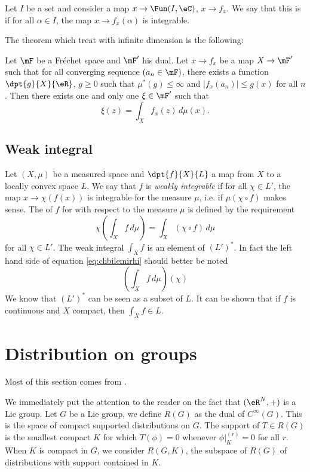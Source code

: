 Let $I$ be a set and consider a map $x\to\Fun(I,\eC)$, $x\to f_x$. We say that this is  if for all $\alpha\in I$, the map $x\to f_x(\alpha)$ is integrable.

The theorem which treat with infinite dimension is the following:

\begin{theorem}
   Let $\mF$ be a Fréchet space and $\mF'$ his dual. Let $x\to f_x$ be a map $X\to\mF'$ such that for all converging sequence $(a_n\in\mF)$, there exists a function  $\dpt{g}{X}{\eR}$, $g\geq0$ such that $\mu^*(g)\leq\infty$ and $| f_x(a_n) |\leq g(x)$ for all $n$. Then there exists one and only one $\xi\in\mF'$ such that
\begin{equation}
  \xi(z)=\int_Xf_x(z)\,d\mu(x).
\end{equation}

\end{theorem}

\subsection{Weak integral}

Let $(X,\mu)$ be a measured space and $\dpt{f}{X}{L}$ a map from $X$ to a locally convex space $L$. We say that $f$ is \emph{weakly integrable} if for all $\chi\in L'$, the map $x\to \chi(f(x))$ is integrable for the measure $\mu$, i.e. if $\mu(\chi\circ f)$ makes sense. The  of $f$ for with respect to the measure $\mu$ is defined by the requirement
\begin{equation} \label{eq:chbilemirhi}
  \chi\left( \int_Xf\,d\mu \right)=\int_X(\chi\circ f)\,d\mu
\end{equation}
for all $\chi\in L'$. The weak integral $\int_Xf$ is an element of $(L')^*$. In fact the left hand side of equation \eqref{eq:chbilemirhi} should better be noted
\[
  \left( \int_Xf\,d\mu \right)(\chi)
\]
We know that $(L')^*$ can be seen as a subset of $L$. It can be shown that if $f$ is continuous and $X$ compact, then $\int_Xf\in L$.
%
   \section{Distribution on groups}
%

Most of this section comes from \cite{Kirillov}.

We immediately put the attention to the reader on the fact that $(\eR^N,+)$ is a Lie group. Let $G$ be a Lie group, we define $R(G)$ as the dual of $ C^{\infty}(G)$. This is the space of compact supported distributions on $G$. The support of $T\in R(G)$ is the smallest compact $K$ for which $T(\phi)=0$ whenever $\phi|_K^{(r)}=0$ for all $r$. When $K$ is compact in $G$, we consider $R(G,K)$, the subspace of $R(G)$ of distributions with support contained in $K$.

